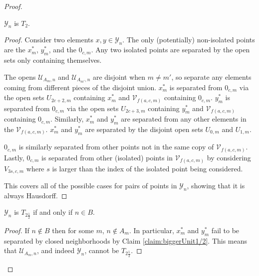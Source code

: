 \documentclass[10pt,a4paper]{amsart}
\begin{document}
\begin{proof}
    \begin{claim}\label{claim:T2for1/2}
        $\mathcal{Y}_n$ is $T_2$.
    \end{claim}

    \begin{proof}
        Consider two elements $x,y\in\mathcal{Y}_n$.
        The only (potentially) non-isolated points are the $x^*_m$, $y^*_m$, and the $0_{c,m}$.
        Any two isolated points are separated by the open sets only containing themselves.

        The opens $\mathcal{U}_{A_m,n}$ and $\mathcal{U}_{A_{m'},n}$ are disjoint when $m\neq m'$, so separate any elements coming from different pieces of the disjoint union.
        $x^*_m$ is separated from $0_{c,m}$ via the open sets $U_{2c+2,m}$ containing $x^*_m$ and $\mathcal{V}_{f(a,c,m)}$ containing $0_{c,m}$.
        $y^*_m$ is separated from $0_{c,m}$ via the open sets $U_{2c+3,m}$ containing $y^*_m$ and $\mathcal{V}_{f(a,c,m)}$ containing $0_{c,m}$.
        Similarly, $x^*_m$ and $y^*_m$ are separated from any other elements in the $\mathcal{V}_{f(a,c,m)}$.
        $x^*_m$ and $y^*_m$ are separated by the disjoint open sets $U_{0,m}$ and $U_{1,m}$.

        $0_{c,m}$ is similarly separated from other points not in the same copy of $\mathcal{V}_{f(a,c,m)}$.
        Lastly, $0_{c,m}$ is separated from other (isolated) points in $\mathcal{V}_{f(a,c,m)}$ by considering $V_{3s,c,m}$ where $s$ is larger than the index of the isolated point being considered.

        This covers all of the possible cases for pairs of points in $\mathcal{Y}_n$, showing that it is always Hausdorff. 
    \end{proof}

    \begin{claim}\label{claim:T21/2Reduction}
        $\mathcal{Y}_n$ is $T_{2\frac12}$ if and only if $n\in B$.
    \end{claim}

    \begin{proof}
        If $n\not\in B$ then for some $m$, $n\not\in A_m$.
        In particular, $x^*_m$ and $y^*_m$ fail to be separated by closed neighborhoods by Claim \ref{claim:biggerUnit1/2}.
        This means that $\mathcal{U}_{A_m,n}$, and indeed $\mathcal{Y}_n$, cannot be $T_{2\frac12}$.


\end{proof}
\end{proof}
\end{document}
